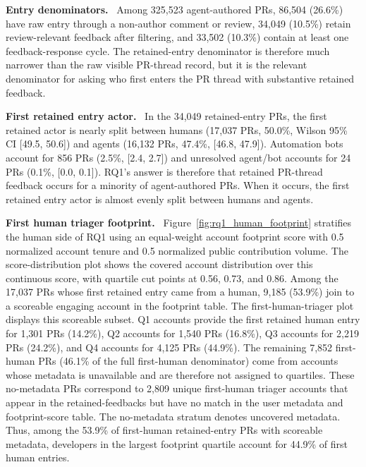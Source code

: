 \documentclass[10pt,conference,anonymous]{IEEEtran}
\newcommand{\runinhead}[1]{\noindent\textbf{#1.}\ }
\begin{document}
\label{sec:rq1_results}

\runinhead{Entry denominators}
Among 325,523 agent-authored PRs, 86,504 (26.6\%) have raw entry through a non-author comment or review, 34,049 (10.5\%) retain review-relevant feedback after filtering, and 33,502 (10.3\%) contain at least one feedback-response cycle.
The retained-entry denominator is therefore much narrower than the raw visible PR-thread record, but it is the relevant denominator for asking who first enters the PR thread with substantive retained feedback.

\runinhead{First retained entry actor}
In the 34,049 retained-entry PRs, the first retained actor is nearly split between humans (17,037 PRs, 50.0\%, Wilson 95\% CI [49.5, 50.6]) and agents (16,132 PRs, 47.4\%, [46.8, 47.9]).
Automation bots account for 856 PRs (2.5\%, [2.4, 2.7]) and unresolved agent/bot accounts for 24 PRs (0.1\%, [0.0, 0.1]).
RQ1's answer is therefore that retained PR-thread feedback occurs for a minority of agent-authored PRs.
When it occurs, the first retained entry actor is almost evenly split between humans and agents.

\runinhead{First human triager footprint}
Figure~\ref{fig:rq1_human_footprint} stratifies the human side of RQ1 using an equal-weight account footprint score with 0.5 normalized account tenure and 0.5 normalized public contribution volume.
The score-distribution plot shows the covered account distribution over this continuous score, with quartile cut points at 0.56, 0.73, and 0.86.
Among the 17,037 PRs whose first retained entry came from a human, 9,185 (53.9\%) join to a scoreable engaging account in the footprint table.
The first-human-triager plot displays this scoreable subset.
Q1 accounts provide the first retained human entry for 1,301 PRs (14.2\%), Q2 accounts for 1,540 PRs (16.8\%), Q3 accounts for 2,219 PRs (24.2\%), and Q4 accounts for 4,125 PRs (44.9\%).
The remaining 7,852 first-human PRs (46.1\% of the full first-human denominator) come from accounts whose metadata is unavailable and are therefore not assigned to quartiles.
These no-metadata PRs correspond to 2,809 unique first-human triager accounts that appear in the retained-feedbacks but have no match in the user metadata and footprint-score table.
The no-metadata stratum denotes uncovered metadata.
Thus, among the 53.9\% of first-human retained-entry PRs with scoreable metadata, developers in the largest footprint quartile account for 44.9\% of first human entries.
\FloatBarrier
\end{document}
